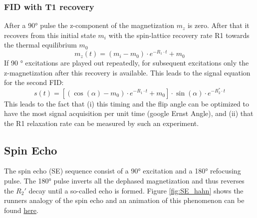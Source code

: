 \documentclass[a4paper,12pt]{extarticle}
\begin{document}
\subsubsection{FID with T1 recovery}

After a 90° pulse the z-component of the magnetization $m_z$ is zero. After that it recovers from this initial state $m_i$ with the spin-lattice recovery rate R1 towards the thermal equilibrium $m_0$
\begin{equation}
\label{eq:T1_rec}
m_z(t)= (m_i-m_0)\cdot e^{-R_1\cdot t } +m_0
\end{equation}If  90 ° excitations are played out repeatedly, for subsequent excitations  only the z-magnetization after this recovery is available. This leads to the signal equation for the second FID:
\begin{equation}
\label{eq:FID_T1}
s(t)=[(\cos(\alpha)-m_0)\cdot e^{-R_1\cdot t } +m_0]\cdot \sin(\alpha)\cdot e^{-R_2^*\cdot t}
\end{equation}This leads to the fact that (i) this timing and the flip angle can be optimized to have the most signal acquisition per unit time (google Ernst Angle), and (ii) that the R1 relaxation rate can be measured by such an experiment.



\subsection{Spin Echo}
The spin echo (SE) sequence consist of a 90° excitation and a 180° refocusing pulse. The 180° pulse inverts all the dephased magnetization and thus reverses the $R_2'$ decay until a so-called echo is formed. Figure \ref{fig:SE_hahn}  shows the runners analogy of the spin echo and an animation of this phenomenon can be found \href{https://blog.ismrm.org/2017/06/06/dwe-part-2/}{here}.  
\end{document}
